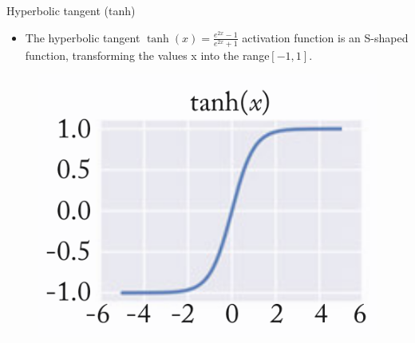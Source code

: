 \documentclass[handout]{beamer}
\begin{document}
\begin{frame}{Hyperbolic tangent (tanh)}
\begin{scriptsize}
\begin{itemize}
\item The hyperbolic tangent $\operatorname{tanh}(x) = \frac{e^{2x}-1}{e^{2x}+1}$ activation function is an S-shaped function, transforming the values x into the range$[-1, 1]$.
\end{itemize}

\begin{figure}[htb]
	\centering
	 \includegraphics[scale=0.3]{pics/tanh.png}
\end{figure}

\end{scriptsize}
\end{frame}
\end{document}
